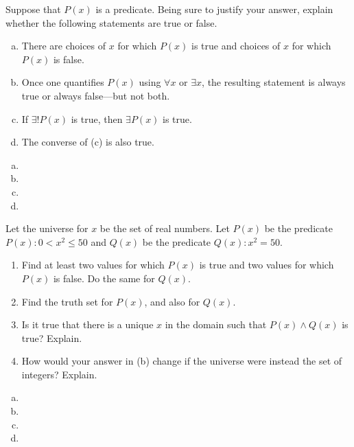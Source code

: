 \documentclass[11pt,letterpaper]{article}
\begin{document}

 Suppose that $P(x)$ is a predicate. Being sure to justify your answer, explain whether the following statements are true or false.
	\begin{enumerate}[(a)]
	\item There are choices of $x$ for which $P(x)$ is true and choices of $x$ for which $P(x)$ is false.
	\item Once one quantifies $P(x)$ using $\forall x$ or $\exists x$, the resulting statement is always true or always false---but not both.
	\item If $\exists! P(x)$ is true, then $\exists P(x)$ is true. 
	\item The converse of (c) is also true.
	\end{enumerate} \pspace

\sol
\begin{enumerate}[(a)]
\item 
\item 
\item 
\item 
\end{enumerate}



\newpage



 Let the universe for $x$ be the set of real numbers. Let $P(x)$ be the predicate $P(x) \colon 0 < x^2 \leq 50$ and $Q(x)$ be the predicate $Q(x) \colon x^2= 50$.
	\begin{enumerate}
	\item Find at least two values for which $P(x)$ is true and two values for which $P(x)$ is false. Do the same for $Q(x)$. 
	\item Find the truth set for $P(x)$, and also for $Q(x)$.
	\item Is it true that there is a unique $x$ in the domain such that $P(x) \wedge Q(x)$ is true? Explain.
	\item How would your answer in (b) change if the universe were instead the set of integers? Explain. 
	\end{enumerate} \pspace

\sol
\begin{enumerate}[(a)]
\item 
\item 
\item 
\item 
\end{enumerate}
\end{document}
